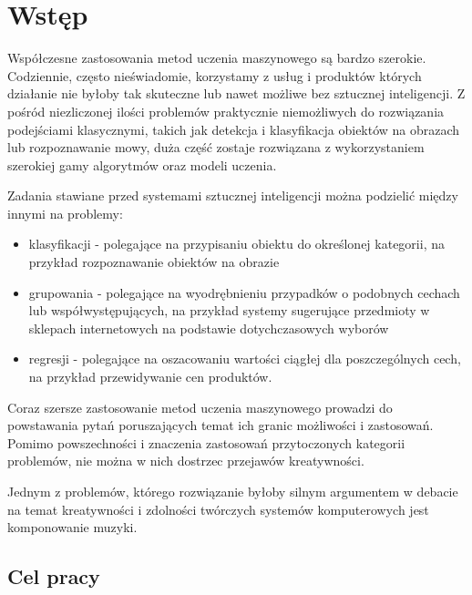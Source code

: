 
\chapter{Wstęp}
{
    Współczesne zastosowania metod uczenia maszynowego są bardzo szerokie. Codziennie, często nieświadomie,
    korzystamy z usług i produktów których działanie nie byłoby tak skuteczne lub nawet możliwe bez sztucznej inteligencji.
    Z pośród niezliczonej ilości problemów praktycznie niemożliwych do rozwiązania podejściami klasycznymi, 
    takich jak detekcja i klasyfikacja obiektów na obrazach lub rozpoznawanie mowy,
    duża część zostaje rozwiązana z wykorzystaniem szerokiej gamy algorytmów oraz modeli uczenia.

    Zadania stawiane przed systemami sztucznej inteligencji można podzielić między innymi na problemy:
    \begin{itemize}
        \setlength\itemsep{-0.5em}
        \item klasyfikacji - polegające na przypisaniu obiektu do określonej kategorii, 
        na przykład rozpoznawanie obiektów na obrazie 
        \item grupowania - polegające na wyodrębnieniu przypadków o podobnych cechach 
        lub współwystępujących, na przykład systemy sugerujące przedmioty w sklepach internetowych na podstawie dotychczasowych wyborów
        \item regresji - polegające na oszacowaniu wartości ciągłej dla poszczególnych cech, 
        na przykład przewidywanie cen produktów.
    \end{itemize}

    \pagebreak

    Coraz szersze zastosowanie metod uczenia maszynowego prowadzi do powstawania pytań poruszających temat 
    ich granic możliwości i zastosowań.
    Pomimo powszechności i znaczenia zastosowań przytoczonych kategorii problemów, nie można w nich dostrzec przejawów kreatywności.
    
    Jednym z problemów, którego rozwiązanie byłoby silnym argumentem w debacie na temat kreatywności i zdolności twórczych
    systemów komputerowych jest komponowanie muzyki.

    \section{Cel pracy}
    {

}}
